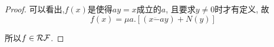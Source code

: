 \begin{proof}
    可以看出,$f(x)$是使得$ay=x$成立的$a$, 且要求$y\neq 0$时才有定义, 故
    $$f(x)=\mu a.[(x\ddot{-}ay)+N(y)]$$
	
    所以$f\in\mathcal{RF}$.
    
\end{proof}